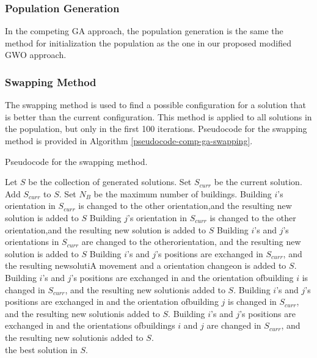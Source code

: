 \subsubsection{Population Generation}
In the competing GA approach, the population generation is the same the method for initialization the population as the one in our proposed modified GWO approach.

\subsubsection{Swapping Method}
The swapping method is used to find a possible configuration for a solution that is better than the current configuration. This method is applied to all solutions in the population, but only in the first 100 iterations. Pseudocode for the swapping method is provided in Algorithm \ref{pseudocode-comp-ga-swapping}.

\begin{algorithm}
\caption{Pseudocode for the swapping method.}
\label{pseudocode-comp-ga-swapping}
\begin{algorithmic}[1]
\State Let $S$ be the collection of generated solutions.
\State Set $S_{curr}$ be the current solution.
\State Add $S_{curr}$ to $S$.
\State Set $N_{B}$ be the maximum number of buildings.
		\State Building $i$'s orientation in $S_{curr}$ is changed to the other orientation,\WRP and the resulting new solution is added to $S$
		\State Building $j$'s orientation in $S_{curr}$ is changed to the other orientation,\WRP and the resulting new solution is added to $S$
		\State Building $i$'s and $j$'s orientations in $S_{curr}$ are changed to the other\WRP orientation, and the resulting new solution is added to $S$
		\State Building $i$'s and $j$'s positions are exchanged in $S_{curr}$, and the resulting new\WRP solutiA movement and a orientation changeon is added to $S$.
		\State Building $i$'s and $j$'s positions are exchanged in and the orientation of\WRP building $i$ is changed in $S_{curr}$, and the resulting new solution\WRP is added to $S$.
		\State Building $i$'s and $j$'s positions are exchanged in and the orientation of\WRP building $j$ is changed in $S_{curr}$, and the resulting new solution\WRP is added to $S$.
		\State Building $i$'s and $j$'s positions are exchanged in and the orientations of\WRP buildings $i$ and $j$ are changed in $S_{curr}$, and the resulting new solution\WRP is added to $S$.
	\EndFor
\EndFor \\
\Return the best solution in $S$.
\end{algorithmic}
\end{algorithm}

